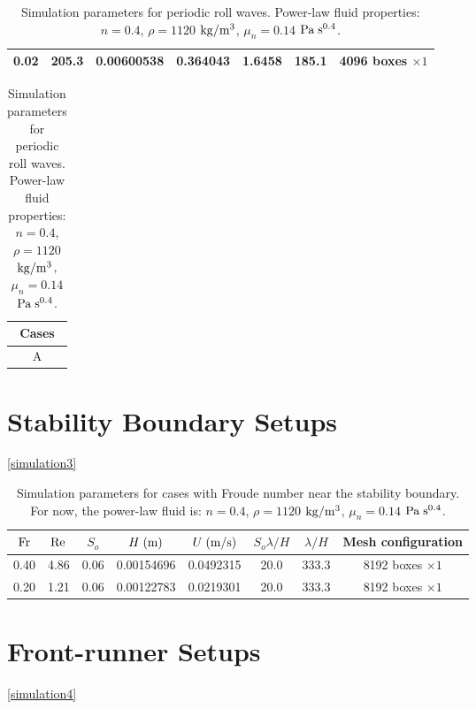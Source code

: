 \documentclass[a4paper]{article}
\newcommand{\fr}{{\rm{Fr}}}
\begin{document}
\begin{table}[htbp]
\begin{subtable}{1\textwidth}
\begin{tabular}{ccccccc}
			0.02 & 205.3 & 0.00600538 & 0.364043 & 1.6458 & 185.1 & 4096 boxes $\times 1$\\
			\bottomrule 
		\end{tabular}
		\caption{Simulation parameters for $\fr=1.50$.}
		\label{params_150}
	\end{subtable}

	\vspace{0.25cm}
	
	\begin{subtable}{1\textwidth}
		\centering
		\begin{tabular}{c}
			Cases\\
			\toprule
				A \\
			\bottomrule 
		\end{tabular}
		\caption{\textcolor{red}{TODO: Simulation parameters for $\fr=1.75$.}}
		\label{params_175}
	\end{subtable}

	\caption{Simulation parameters for periodic roll waves. Power-law fluid properties: $n=0.4$, $\rho=1120$ $\rm{kg/m^3}$, $\mu_n=0.14$ $\rm Pa\;s^{0.4}$.}
	\label{simulation2}
\end{table}

\section{Stability Boundary Setups}
\autoref{simulation3}
\begin{table}[htbp]
	\centering
	\begin{tabular}{cccccccc}
		$\fr$ & $\rm Re$ & $S_o$ & $H\;{\rm (m)}$ & $U\;{\rm (m/s)}$ & $S_o\lambda/H$ & $\lambda/H$ & Mesh configuration\\
		\toprule
		0.40 & 4.86 & 0.06 & 0.00154696 & 0.0492315 & 20.0 & 333.3 & 8192 boxes $\times 1$\\
		0.20 & 1.21 & 0.06 & 0.00122783 & 0.0219301 & 20.0 & 333.3 & 8192 boxes $\times 1$\\
		
		\bottomrule 
	\end{tabular}
	\caption{Simulation parameters for cases with Froude number near the stability boundary. For now, the power-law fluid is: $n=0.4$, $\rho=1120$ $\rm{kg/m^3}$, $\mu_n=0.14$ $\rm Pa\;s^{0.4}$.}
	\label{simulation3}
\end{table}

\section{Front-runner Setups}
\autoref{simulation4}
\end{document}
